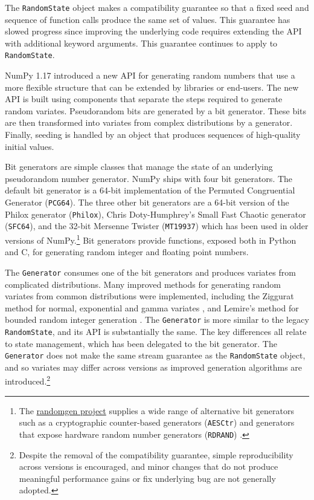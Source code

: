 The \texttt{RandomState} object makes a compatibility guarantee so that a fixed
seed and sequence of function calls produce the same set of values. This
guarantee has slowed progress since improving the underlying code requires
extending the API with additional keyword arguments. This guarantee continues to
apply to \texttt{RandomState}.

NumPy 1.17 introduced a new API for generating random numbers that use a more
flexible structure that can be extended by libraries or end-users. The new API
is built using components that separate the steps required to generate random
variates. Pseudorandom bits are generated by a bit generator. These bits are
then transformed into variates from complex distributions by a generator.
Finally, seeding is handled by an object that produces sequences of high-quality
initial values.

Bit generators are simple classes that manage the state of an underlying
pseudorandom number generator. NumPy ships with four bit generators. The default
bit generator is a 64-bit implementation of the Permuted Congruential Generator
\cite{pcg64} (\texttt{PCG64}). The three other bit generators are a 64-bit version
of the Philox generator \cite{random123} (\texttt{Philox}), Chris Doty-Humphrey's
Small Fast Chaotic generator \cite{practrand} (\texttt{SFC64}), and the 32-bit
Mersenne Twister \cite{mt19937} (\texttt{MT19937}) which has been used in older
versions of NumPy.\footnote{The
\href{https://github.com/bashtage/randomgen}{randomgen project} supplies a wide
range of alternative bit generators such as a cryptographic counter-based
generators (\texttt{AESCtr}) and generators that expose hardware random number
generators (\texttt{RDRAND}) \cite{randomgen}.} Bit generators provide
functions, exposed both in Python and C, for generating random integer
and floating point numbers.

The \texttt{Generator} consumes one of the bit generators and produces variates
from complicated distributions. Many improved methods for generating random
variates from common distributions were implemented, including the Ziggurat
method for normal, exponential and gamma variates \cite{ziggurat}, and Lemire's
method for bounded random integer generation \cite{lemire}. The \texttt{Generator}
is more similar to the legacy \texttt{RandomState}, and its API is substantially
the same. The key differences all relate to state management, which has been
delegated to the bit generator. The \texttt{Generator} does not make the same
stream guarantee as the \texttt{RandomState} object, and so variates may differ
across versions as improved generation algorithms are
introduced.\footnote{Despite the removal of the compatibility guarantee, simple
reproducibility across versions is encouraged, and minor changes that do not
produce meaningful performance gains or fix underlying bug are not generally
adopted.}

